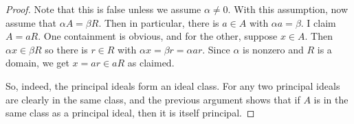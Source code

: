 \begin{proof}
    Note that this is false unless we assume $\alpha \neq 0$. With this assumption, now assume that $\alpha A = \beta R$. Then in particular, there is $a \in A$ with $\alpha a = \beta$. I claim $A = aR$. One containment is obvious, and for the other, suppose $x \in A$. Then $\alpha x \in \beta R$ so there is $r \in R$ with $\alpha x = \beta r = \alpha ar$. Since $\alpha$ is nonzero and $R$ is a domain, we get $x = ar \in aR$ as claimed.

    So, indeed, the principal ideals form an ideal class. For any two principal ideals are clearly in the same class, and the previous argument shows that if $A$ is in the same class as a principal ideal, then it is itself principal.
\end{proof}
